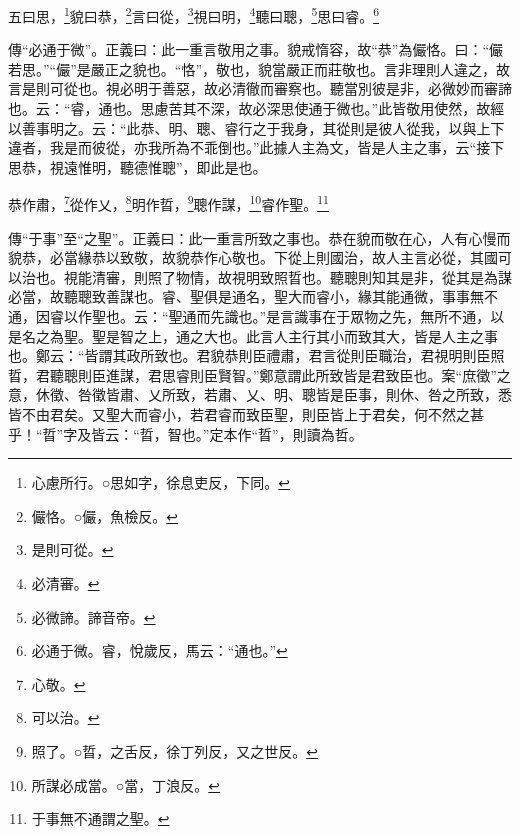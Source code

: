 五曰思，\footnote{心慮所行。○思如字，徐息吏反，下同。}貌曰恭，\footnote{儼恪。○儼，魚檢反。}言曰從，\footnote{是則可從。}視曰明，\footnote{必清審。}聽曰聰，\footnote{必微諦。諦音帝。}思曰睿。\footnote{必通于微。睿，悅歲反，馬云：“通也。”}


{\noindent\zhuan{}\fzbyks 傳“必通于微”。正義曰：此一重言敬用之事。貌戒惰容，故“恭”為儼恪。曰：“儼若思。”“儼”是嚴正之貌也。“恪”，敬也，貌當嚴正而莊敬也。言非理則人違之，故言是則可從也。視必明于善惡，故必清徹而審察也。聽當別彼是非，必微妙而審諦也。云：“睿，通也。思慮苦其不深，故必深思使通于微也。”此皆敬用使然，故經以善事明之。云：“此恭、明、聰、睿行之于我身，其從則是彼人從我，以與上下違者，我是而彼從，亦我所為不乖倒也。”此據人主為文，皆是人主之事，云“接下思恭，視遠惟明，聽德惟聰”，即此是也。 \par}

恭作肅，\footnote{心敬。}從作乂，\footnote{可以治。}明作晢，\footnote{照了。○晢，之舌反，徐丁列反，又之世反。}聰作謀，\footnote{所謀必成當。○當，丁浪反。}睿作聖。\footnote{于事無不通謂之聖。}

{\noindent\zhuan{}\fzbyks 傳“于事”至“之聖”。正義曰：此一重言所致之事也。恭在貌而敬在心，人有心慢而貌恭，必當緣恭以致敬，故貌恭作心敬也。下從上則國治，故人主言必從，其國可以治也。視能清審，則照了物情，故視明致照晢也。聽聰則知其是非，從其是為謀必當，故聽聰致善謀也。睿、聖俱是通名，聖大而睿小，緣其能通微，事事無不通，因睿以作聖也。云：“聖通而先識也。”是言識事在于眾物之先，無所不通，以是名之為聖。聖是智之上，通之大也。此言人主行其小而致其大，皆是人主之事也。鄭云：“皆謂其政所致也。君貌恭則臣禮肅，君言從則臣職治，君視明則臣照晢，君聽聰則臣進謀，君思睿則臣賢智。”鄭意謂此所致皆是君致臣也。案“庶徵”之意，休徵、咎徵皆肅、乂所致，若肅、乂、明、聰皆是臣事，則休、咎之所致，悉皆不由君矣。又聖大而睿小，若君睿而致臣聖，則臣皆上于君矣，何不然之甚乎！“晢”字及皆云：“晢，智也。”定本作“晢”，則讀為哲。 \par}

